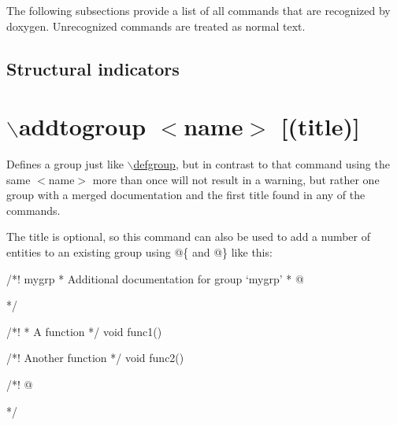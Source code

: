 \begin{multicols}{2}
\begin{DoxyCompactList}
\item {}
\item {}
\item {}
\item {}
\item {}
\item {}
\item {}
\item {}
\end{DoxyCompactList}
\end{multicols}
\normalsize


The following subsections provide a list of all commands that are recognized by doxygen. Unrecognized commands are treated as normal text.

 \subsection*{ Structural indicators  }

\hypertarget{commands_cmdaddtogroup}{}\section{$\backslash$addtogroup $<$name$>$ \mbox{[}(title)\mbox{]}}\label{commands_cmdaddtogroup}
 Defines a group just like \hyperlink{commands_cmddefgroup}{$\backslash$defgroup}, but in contrast to that command using the same $<$name$>$ more than once will not result in a warning, but rather one group with a merged documentation and the first title found in any of the commands.

The title is optional, so this command can also be used to add a number of entities to an existing group using @\{ and @\} like this:

\begin{DoxyVerb}
  /*! \addtogroup mygrp
   *  Additional documentation for group `mygrp'
   *  @{
   */

  /*!
   *  A function 
   */
  void func1()
  {
  }

  /*! Another function */
  void func2()
  {
  }

  /*! @} */
\end{DoxyVerb}


